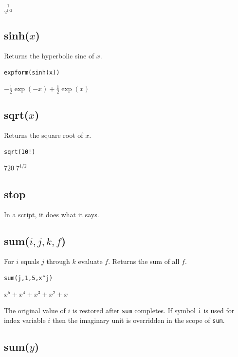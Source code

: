 \documentclass[12pt]{article}
\begin{document}
\noindent
$\displaystyle \frac{1}{2^{1/2}}$

\subsection*{sinh($x$)}

Returns the hyperbolic sine of $x$.

{\color{blue}
\begin{verbatim}
expform(sinh(x))
\end{verbatim}
}

\noindent
$\displaystyle -\tfrac{1}{2}\exp(-x)+\tfrac{1}{2}\exp(x)$

\subsection*{sqrt($x$)}

Returns the square root of $x$.

{\color{blue}
\begin{verbatim}
sqrt(10!)
\end{verbatim}
}

\noindent
$\displaystyle 720\; 7^{1/2}$

\subsection*{stop}

In a script, it does what it says.

\subsection*{sum($i,j,k,f$)}

For $i$ equals $j$ through $k$ evaluate $f$.
Returns the sum of all $f$.

{\color{blue}
\begin{verbatim}
sum(j,1,5,x^j)
\end{verbatim}
}

\noindent
$\displaystyle x^5+x^4+x^3+x^2+x$

\bigskip
\noindent
The original value of $i$ is restored after {\tt sum} completes.
If symbol {\tt i} is used for index variable $i$
then the imaginary unit is overridden in the scope of {\tt sum}.

\subsection*{sum($y$)}
\end{document}
